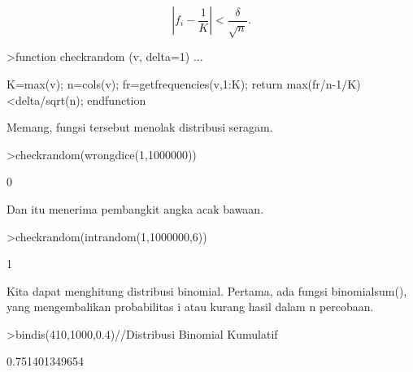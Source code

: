 \documentclass[12pt,arial,letterpaper]{book}
\begin{document}
\begin{eulercomment}
\begin{eulercomment}
\begin{eulercomment}
\begin{eulercomment}
\begin{eulercomment}
\begin{eulercomment}
\begin{eulercomment}
\begin{eulercomment}
\begin{eulercomment}
\begin{eulercomment}
\begin{eulercomment}
\begin{eulercomment}
\begin{eulercomment}
\begin{eulercomment}
\begin{eulercomment}
\begin{eulercomment}
\begin{eulercomment}
\begin{eulercomment}
\begin{eulercomment}
\begin{eulercomment}
\begin{eulercomment}
\begin{eulercomment}
\begin{eulercomment}
\begin{eulercomment}
\begin{eulercomment}
\begin{eulercomment}
\begin{eulercomment}
\begin{eulercomment}
\begin{eulercomment}
\begin{eulercomment}
\begin{eulercomment}
\begin{eulercomment}
\begin{eulercomment}
\end{eulercomment}
\begin{eulerformula}
\[
\left|f_i-\frac{1}{K}\right| < \frac{\delta}{\sqrt{n}}.
\]
\end{eulerformula}
\begin{eulerprompt}
>function checkrandom (v, delta=1) ...
\end{eulerprompt}
\begin{eulerudf}
    K=max(v); n=cols(v);
    fr=getfrequencies(v,1:K);
    return max(fr/n-1/K)<delta/sqrt(n);
    endfunction
\end{eulerudf}
\begin{eulercomment}
Memang, fungsi tersebut menolak distribusi seragam.
\end{eulercomment}
\begin{eulerprompt}
>checkrandom(wrongdice(1,1000000))
\end{eulerprompt}
\begin{euleroutput}
  0
\end{euleroutput}
\begin{eulercomment}
Dan itu menerima pembangkit angka acak bawaan.
\end{eulercomment}
\begin{eulerprompt}
>checkrandom(intrandom(1,1000000,6))
\end{eulerprompt}
\begin{euleroutput}
  1
\end{euleroutput}
\begin{eulercomment}
Kita dapat menghitung distribusi binomial. Pertama, ada fungsi
binomialsum(), yang mengembalikan probabilitas i atau kurang hasil
dalam n percobaan.
\end{eulercomment}
\begin{eulerprompt}
>bindis(410,1000,0.4)//Distribusi Binomial Kumulatif
\end{eulerprompt}
\begin{euleroutput}
  0.751401349654
\end{euleroutput}

\end{eulercomment}
\end{eulercomment}
\end{eulercomment}
\end{eulercomment}
\end{eulercomment}
\end{eulercomment}
\end{eulercomment}
\end{eulercomment}
\end{eulercomment}
\end{eulercomment}
\end{eulercomment}
\end{eulercomment}
\end{eulercomment}
\end{eulercomment}
\end{eulercomment}
\end{eulercomment}
\end{eulercomment}
\end{eulercomment}
\end{eulercomment}
\end{eulercomment}
\end{eulercomment}
\end{eulercomment}
\end{eulercomment}
\end{eulercomment}
\end{eulercomment}
\end{eulercomment}
\end{eulercomment}
\end{eulercomment}
\end{eulercomment}
\end{eulercomment}
\end{eulercomment}
\end{eulercomment}
\end{document}
